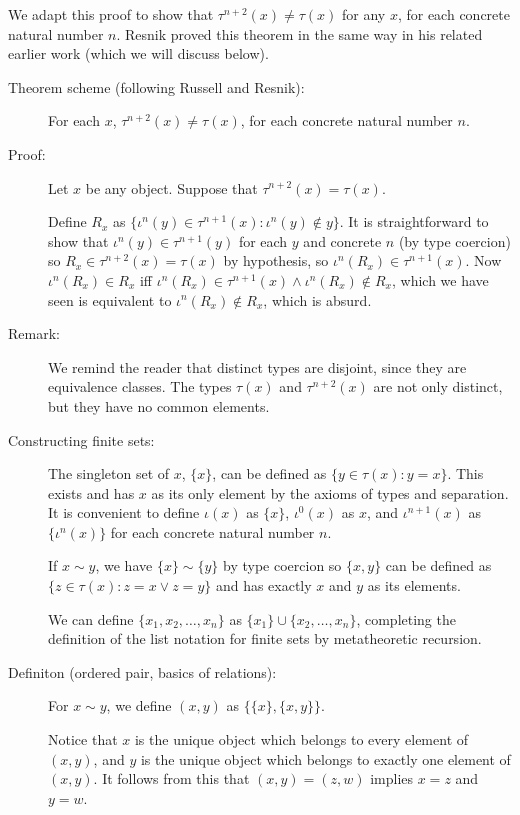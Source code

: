 \documentclass[12pt]{article}
\begin{document}
We adapt this proof to show that $\tau^{n+2}(x) \neq \tau(x)$ for any $x$, for each concrete natural number $n$.  Resnik proved this theorem in the same way in his related earlier work (which we will discuss below).
\begin{description}
\item[Theorem scheme (following Russell and Resnik):]  For each $x$, $\tau^{n+2}(x) \neq \tau(x)$, for each concrete natural number $n$.

\item[Proof:]  Let $x$ be any object.  Suppose that $\tau^{n+2}(x)=\tau(x)$. 

Define $R_x$ as $\{\iota^n(y)\in \tau^{n+1}(x):\iota^n(y) \not\in y\}$.  It is straightforward to show that $\iota^n(y) \in \tau^{n+1}(y)$ for each $y$ and concrete $n$ (by type coercion) so $R_x \in \tau^{n+2}(x) = \tau(x)$ by hypothesis, so $\iota^n(R_x) \in \tau^{n+1}(x)$.    Now $\iota^n(R_x) \in R_x$ iff $\iota^n(R_x) \in \tau^{n+1}(x) \wedge \iota^n(R_x) \not\in R_x$, which we have seen is equivalent to $\iota^n(R_x) \not\in R_x$, which is absurd.

\item[Remark:]  We remind the reader that distinct types are disjoint, since they are equivalence classes.  The types $\tau(x)$ and $\tau^{n+2}(x)$ are not only distinct, but they have no common  elements.

\item[Constructing finite sets:]  The singleton set of $x$, $\{x\}$, can be defined as $\{y \in \tau(x):y=x\}$.  This exists and has $x$ as its only element by the axioms of types and separation.  It is convenient to define $\iota(x)$ as $\{x\}$, $\iota^0(x)$ as $x$,
and $\iota^{n+1}(x)$ as $\{\iota^n(x)\}$ for each concrete natural number $n$.

If $x \sim y$, we have $\{x\} \sim \{y\}$ by type coercion so $\{x,y\}$ can be defined
as $\{z \in \tau(x):z =x \vee z=y\}$ and has exactly $x$ and $y$ as its elements.

We can define $\{x_1,x_2,\ldots,x_n\}$ as $\{x_1\} \cup \{x_2,\ldots,x_n\}$, completing the definition of the list notation for finite sets by metatheoretic recursion.

\item[Definiton (ordered pair, basics of relations):]  For $x \sim y$, we define $(x,y)$ as $\{\{x\},\{x,y\}\}$.  

Notice that $x$ is the unique object which belongs to every element of $(x,y)$, and $y$ is the unique object which belongs to exactly one element of $(x,y)$.  It follows from this that $(x,y)=(z,w)$ implies $x=z$ and $y=w$.  


\end{description}
\end{document}
